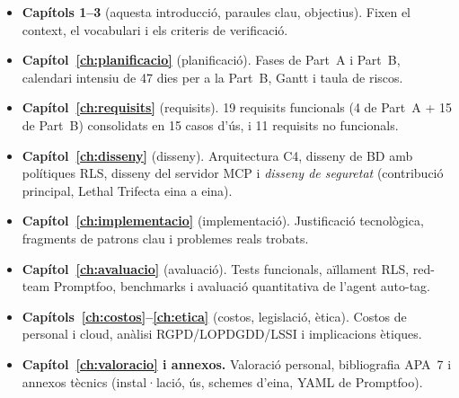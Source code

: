 \begin{itemize}
  \item \textbf{Capítols 1--3} (aquesta introducció, paraules clau,
    objectius). Fixen el context, el vocabulari i els criteris de
    verificació.
  \item \textbf{Capítol~\ref{ch:planificacio}} (planificació).
    Fases de Part~A i Part~B, calendari intensiu de 47 dies per a la
    Part~B, Gantt i taula de riscos.
  \item \textbf{Capítol~\ref{ch:requisits}} (requisits). 19 requisits
    funcionals (4 de Part~A + 15 de Part~B) consolidats en 15 casos
    d'ús, i 11 requisits no funcionals.
  \item \textbf{Capítol~\ref{ch:disseny}} (disseny). Arquitectura C4, disseny de BD
    amb polítiques RLS, disseny del servidor MCP i \emph{disseny de
    seguretat} (contribució principal, Lethal Trifecta eina a eina).
  \item \textbf{Capítol~\ref{ch:implementacio}} (implementació). Justificació tecnològica,
    fragments de patrons clau i problemes reals trobats.
  \item \textbf{Capítol~\ref{ch:avaluacio}} (avaluació). Tests
    funcionals, aïllament RLS, red-team Promptfoo, benchmarks i
    avaluació quantitativa de l'agent auto-tag.
  \item \textbf{Capítols~\ref{ch:costos}--\ref{ch:etica}} (costos, legislació, ètica). Costos
    de personal i cloud, anàlisi RGPD/LOPDGDD/LSSI i implicacions
    ètiques.
  \item \textbf{Capítol~\ref{ch:valoracio} i annexos.} Valoració personal,
    bibliografia APA~7 i annexos tècnics (instal·lació, ús, schemes
    d'eina, YAML de Promptfoo).
\end{itemize}
